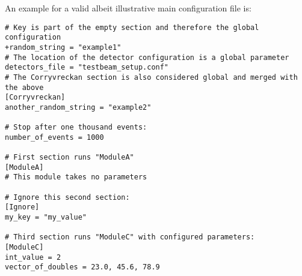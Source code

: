 An example for a valid albeit illustrative \corry main configuration file is:
\begin{verbatim}
# Key is part of the empty section and therefore the global configuration
+random_string = "example1"
# The location of the detector configuration is a global parameter
detectors_file = "testbeam_setup.conf"
# The Corryvreckan section is also considered global and merged with the above
[Corryvreckan]
another_random_string = "example2"

# Stop after one thousand events:
number_of_events = 1000

# First section runs "ModuleA"
[ModuleA]
# This module takes no parameters

# Ignore this second section:
[Ignore]
my_key = "my_value"

# Third section runs "ModuleC" with configured parameters:
[ModuleC]
int_value = 2
vector_of_doubles = 23.0, 45.6, 78.9
\end{verbatim}

